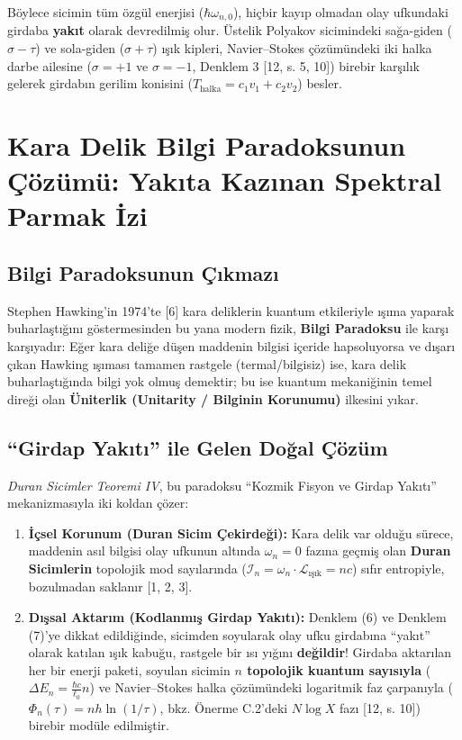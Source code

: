 \documentclass[12pt,a4paper]{article}
\begin{document}
Böylece sicimin tüm özgül enerjisi ($\hbar \omega_{n,0}$), hiçbir kayıp olmadan olay ufkundaki girdaba \textbf{yakıt} olarak devredilmiş olur. Üstelik Polyakov sicimindeki sağa-giden ($\sigma - \tau$) ve sola-giden ($\sigma + \tau$) ışık kipleri, Navier--Stokes çözümündeki iki halka darbe ailesine ($\sigma = +1$ ve $\sigma = -1$, Denklem 3 [12, s. 5, 10]) birebir karşılık gelerek girdabın gerilim konisini ($T_{\text{halka}} = c_1 v_1 + c_2 v_2$) besler.

\section{Kara Delik Bilgi Paradoksunun Çözümü: Yakıta Kazınan Spektral Parmak İzi}

\subsection{Bilgi Paradoksunun Çıkmazı}

Stephen Hawking'in 1974'te [6] kara deliklerin kuantum etkileriyle ışıma yaparak buharlaştığını göstermesinden bu yana modern fizik, \textbf{Bilgi Paradoksu} ile karşı karşıyadır: Eğer kara deliğe düşen maddenin bilgisi içeride hapsoluyorsa ve dışarı çıkan Hawking ışıması tamamen rastgele (termal/bilgisiz) ise, kara delik buharlaştığında bilgi yok olmuş demektir; bu ise kuantum mekaniğinin temel direği olan \textbf{Üniterlik (Unitarity / Bilginin Korunumu)} ilkesini yıkar.

\subsection{``Girdap Yakıtı'' ile Gelen Doğal Çözüm}

\textit{Duran Sicimler Teoremi IV}, bu paradoksu ``Kozmik Fisyon ve Girdap Yakıtı'' mekanizmasıyla iki koldan çözer:

\begin{enumerate}
    \item \textbf{İçsel Korunum (Duran Sicim Çekirdeği):} Kara delik var olduğu sürece, maddenin asıl bilgisi olay ufkunun altında $\omega_n = 0$ fazına geçmiş olan \textbf{Duran Sicimlerin} topolojik mod sayılarında ($\mathcal{I}_n = \omega_n \cdot \mathcal{L}_{\text{ışık}} = n c$) sıfır entropiyle, bozulmadan saklanır [1, 2, 3].
    \item \textbf{Dışsal Aktarım (Kodlanmış Girdap Yakıtı):} Denklem (6) ve Denklem (7)'ye dikkat edildiğinde, sicimden soyularak olay ufku girdabına ``yakıt'' olarak katılan ışık kabuğu, rastgele bir ısı yığını \textbf{değildir}! Girdaba aktarılan her bir enerji paketi, soyulan sicimin \textbf{$n$ topolojik kuantum sayısıyla} ($\Delta E_n = \frac{\hbar c}{\ell_0} n$) ve Navier--Stokes halka çözümündeki logaritmik faz çarpanıyla ($\Phi_n(\tau) = n h \ln(1/\tau)$, bkz. Önerme C.2'deki $N \log X$ fazı [12, s. 10]) birebir modüle edilmiştir.
\end{enumerate}
\end{document}
